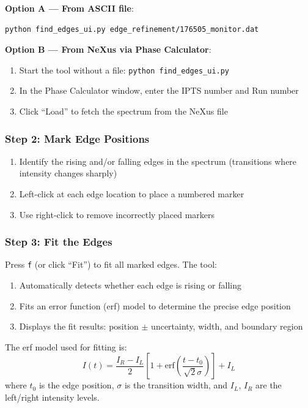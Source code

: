 \documentclass[11pt,letterpaper]{article}
\begin{document}
\textbf{Option A --- From ASCII file}:
\begin{lstlisting}[language=bash]
python find_edges_ui.py edge_refinement/176505_monitor.dat
\end{lstlisting}

\textbf{Option B --- From NeXus via Phase Calculator}:
\begin{enumerate}
    \item Start the tool without a file: \texttt{python find\_edges\_ui.py}
    \item In the Phase Calculator window, enter the IPTS number and Run number
    \item Click ``Load'' to fetch the spectrum from the NeXus file
\end{enumerate}

\subsubsection{Step 2: Mark Edge Positions}

\begin{enumerate}
    \item Identify the rising and/or falling edges in the spectrum (transitions where intensity 
    changes sharply)
    \item Left-click at each edge location to place a numbered marker
    \item Use right-click to remove incorrectly placed markers
\end{enumerate}

\subsubsection{Step 3: Fit the Edges}

Press \texttt{f} (or click ``Fit'') to fit all marked edges. The tool:
\begin{enumerate}
    \item Automatically detects whether each edge is rising or falling
    \item Fits an error function (erf) model to determine the precise edge position
    \item Displays the fit results: position $\pm$ uncertainty, width, and boundary region
\end{enumerate}

The erf model used for fitting is:
\begin{equation}
    I(t) = \frac{I_R - I_L}{2} \left[ 1 + \text{erf}\left(\frac{t - t_0}{\sqrt{2}\sigma}\right) \right] + I_L
\end{equation}
where $t_0$ is the edge position, $\sigma$ is the transition width, and $I_L$, $I_R$ are the 
left/right intensity levels.
\end{document}
